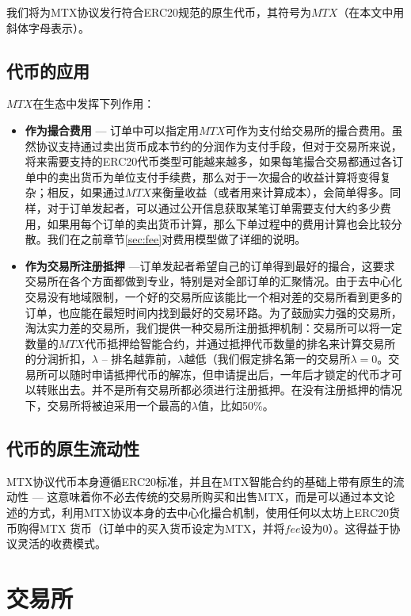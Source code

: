 \documentclass[UTF8,nofonts]{ctexart}
\begin{document}
我们将为MTX协议发行符合ERC20规范的原生代币，其符号为$MTX$（在本文中用斜体字母表示）。


\subsection{代币的应用}

$MTX$在生态中发挥下列作用：

\begin{itemize}
	\item \textbf{作为撮合费用} --- 订单中可以指定用$MTX$可作为支付给交易所的撮合费用。虽然协议支持通过卖出货币成本节约的分润作为支付手段，但对于交易所来说，将来需要支持的ERC20代币类型可能越来越多，如果每笔撮合交易都通过各订单中的卖出货币为单位支付手续费，那么对于一次撮合的收益计算将变得复杂；相反，如果通过$MTX$来衡量收益（或者用来计算成本），会简单得多。同样，对于订单发起者，可以通过公开信息获取某笔订单需要支付大约多少费用，如果用每个订单的卖出货币计算，那么下单过程中的费用计算也会比较分散。我们在之前章节\ref{sec:fee}对费用模型做了详细的说明。
	\item \textbf{作为交易所注册抵押} ---订单发起者希望自己的订单得到最好的撮合，这要求交易所在各个方面都做到专业，特别是对全部订单的汇聚情况。由于去中心化交易没有地域限制，一个好的交易所应该能比一个相对差的交易所看到更多的订单，也应能在最短时间内找到最好的交易环路。为了鼓励实力强的交易所，淘汰实力差的交易所，我们提供一种交易所注册抵押机制：交易所可以将一定数量的$MTX$代币抵押给智能合约，并通过抵押代币数量的排名来计算交易所的分润折扣，$\lambda$ -- 排名越靠前，$\lambda$越低（我们假定排名第一的交易所$\lambda=0$。交易所可以随时申请抵押代币的解冻，但申请提出后，一年后才锁定的代币才可以转账出去。并不是所有交易所都必须进行注册抵押。在没有注册抵押的情况下，交易所将被迫采用一个最高的$\lambda$值，比如50\%。
\end{itemize}


\subsection{代币的原生流动性}

MTX协议代币本身遵循ERC20标准，并且在MTX智能合约的基础上带有原生的流动性 --- 这意味着你不必去传统的交易所购买和出售MTX，而是可以通过本文论述的方式，利用MTX协议本身的去中心化撮合机制，使用任何以太坊上ERC20货币购得MTX 货币（订单中的买入货币设定为MTX，并将$fee$设为0）。这得益于协议灵活的收费模式。

\section{交易所\label{sec:exchange}}
\end{document}
